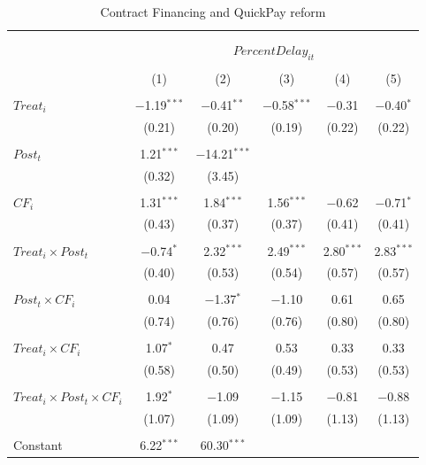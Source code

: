 \documentclass[
]{article}
\begin{document}
\begin{table}[H] \centering 
  \caption{Contract Financing and QuickPay reform} 
  \label{} 
\small 
\begin{tabular}{@{\extracolsep{-2pt}}lccccc} 
\\[-1.8ex]\hline 
\hline \\[-1.8ex] 
\\[-1.8ex] & \multicolumn{5}{c}{$PercentDelay_{it}$  } \\ 
\\[-1.8ex] & (1) & (2) & (3) & (4) & (5)\\ 
\hline \\[-1.8ex] 
 $Treat_i$ & $-$1.19$^{***}$ & $-$0.41$^{**}$ & $-$0.58$^{***}$ & $-$0.31 & $-$0.40$^{*}$ \\ 
  & (0.21) & (0.20) & (0.19) & (0.22) & (0.22) \\ 
  & & & & & \\ 
 $Post_t$ & 1.21$^{***}$ & $-$14.21$^{***}$ &  &  &  \\ 
  & (0.32) & (3.45) &  &  &  \\ 
  & & & & & \\ 
 $CF_i$ & 1.31$^{***}$ & 1.84$^{***}$ & 1.56$^{***}$ & $-$0.62 & $-$0.71$^{*}$ \\ 
  & (0.43) & (0.37) & (0.37) & (0.41) & (0.41) \\ 
  & & & & & \\ 
 $Treat_i \times Post_t$ & $-$0.74$^{*}$ & 2.32$^{***}$ & 2.49$^{***}$ & 2.80$^{***}$ & 2.83$^{***}$ \\ 
  & (0.40) & (0.53) & (0.54) & (0.57) & (0.57) \\ 
  & & & & & \\ 
 $Post_t \times CF_i$ & 0.04 & $-$1.37$^{*}$ & $-$1.10 & 0.61 & 0.65 \\ 
  & (0.74) & (0.76) & (0.76) & (0.80) & (0.80) \\ 
  & & & & & \\ 
 $Treat_i \times CF_i$ & 1.07$^{*}$ & 0.47 & 0.53 & 0.33 & 0.33 \\ 
  & (0.58) & (0.50) & (0.49) & (0.53) & (0.53) \\ 
  & & & & & \\ 
 $Treat_i \times Post_t \times CF_i$ & 1.92$^{*}$ & $-$1.09 & $-$1.15 & $-$0.81 & $-$0.88 \\ 
  & (1.07) & (1.09) & (1.09) & (1.13) & (1.13) \\ 
  & & & & & \\ 
 Constant & 6.22$^{***}$ & 60.30$^{***}$ &  &  &  \\ 

\end{tabular}
\end{table}
\end{document}
